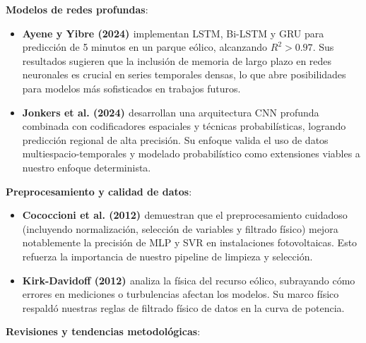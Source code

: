 \documentclass[conference]{IEEEtran}
\begin{document}
\textbf{Modelos de redes profundas}:
\begin{itemize}[leftmargin=*,itemsep=1pt]

\item \textbf{Ayene y Yibre (2024) \cite{ayene2024wind}} implementan LSTM, Bi-LSTM y GRU para predicción de 5 minutos en un parque eólico, alcanzando \(R^2 > 0.97\). Sus resultados sugieren que la inclusión de memoria de largo plazo en redes neuronales es crucial en series temporales densas, lo que abre posibilidades para modelos más sofisticados en trabajos futuros.

\item \textbf{Jonkers et al. (2024) \cite{jonkers2024probabilistic}} desarrollan una arquitectura CNN profunda combinada con codificadores espaciales y técnicas probabilísticas, logrando predicción regional de alta precisión. Su enfoque valida el uso de datos multiespacio-temporales y modelado probabilístico como extensiones viables a nuestro enfoque determinista.

\end{itemize}


\textbf{Preprocesamiento y calidad de datos}:
\begin{itemize}[leftmargin=*,itemsep=1pt]

\item \textbf{Cococcioni et al. (2012) \cite{cococcioni2012oneday}} demuestran que el preprocesamiento cuidadoso (incluyendo normalización, selección de variables y filtrado físico) mejora notablemente la precisión de MLP y SVR en instalaciones fotovoltaicas. Esto refuerza la importancia de nuestro pipeline de limpieza y selección.

\item \textbf{Kirk-Davidoff (2012) \cite{kirk2012forecasting}} analiza la física del recurso eólico, subrayando cómo errores en mediciones o turbulencias afectan los modelos. Su marco físico respaldó nuestras reglas de filtrado físico de datos en la curva de potencia.

\end{itemize}
	
\textbf{Revisiones y tendencias metodológicas}:
\end{document}
